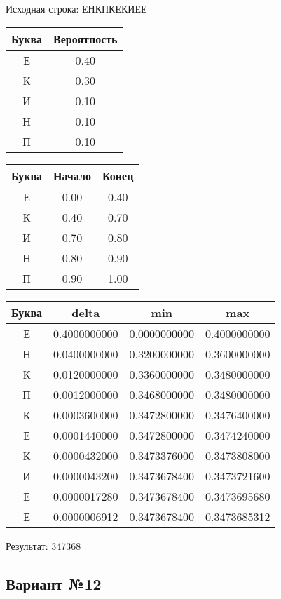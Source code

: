 \documentclass[a4paper, 12pt]{article}
\begin{document}
Исходная строка: ЕНКПКЕКИЕЕ\
\begin{center}
 \begin{tabular}{ |c|c| } 
  \hline
     Буква & Вероятность \\ \hline
Е & 0.40\\\hline
К & 0.30\\\hline
И & 0.10\\\hline
Н & 0.10\\\hline
П & 0.10
\\ \hline \end{tabular}
\end{center}
\begin{center}
 \begin{tabular}{ |c|c|c| } 
  \hline
     Буква & Начало & Конец \\ \hline
Е & 0.00 & 0.40\\\hline
К & 0.40 & 0.70\\\hline
И & 0.70 & 0.80\\\hline
Н & 0.80 & 0.90\\\hline
П & 0.90 & 1.00
\\ \hline \end{tabular}
\end{center}
\begin{center}
 \begin{tabular}{ |c|c|c|c| } 
  \hline
     Буква & delta & min & max \\ \hline
Е & 0.4000000000 & 0.0000000000 & 0.4000000000\\\hline
Н & 0.0400000000 & 0.3200000000 & 0.3600000000\\\hline
К & 0.0120000000 & 0.3360000000 & 0.3480000000\\\hline
П & 0.0012000000 & 0.3468000000 & 0.3480000000\\\hline
К & 0.0003600000 & 0.3472800000 & 0.3476400000\\\hline
Е & 0.0001440000 & 0.3472800000 & 0.3474240000\\\hline
К & 0.0000432000 & 0.3473376000 & 0.3473808000\\\hline
И & 0.0000043200 & 0.3473678400 & 0.3473721600\\\hline
Е & 0.0000017280 & 0.3473678400 & 0.3473695680\\\hline
Е & 0.0000006912 & 0.3473678400 & 0.3473685312
\\ \hline \end{tabular}
\end{center}
Результат: 347368
\pagebreak
\subsection{Вариант №12}
\end{document}

